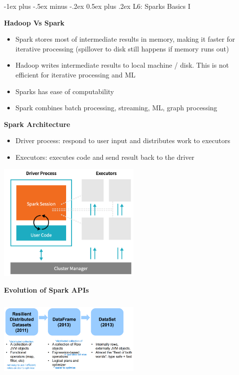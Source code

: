\documentclass[10pt, landscape]{article}
\makeatletter
\renewcommand{\section}{\@startsection{section}{1}{0mm}%
                                {-1ex plus -.5ex minus -.2ex}%
                                {0.5ex plus .2ex}%
                                {\normalfont\large\bfseries}}
\makeatother
\begin{document}
\begin{multicols}{4}

\section{L6: Sparks Basics I}

\textbf{Hadoop Vs Spark}
\begin{itemize}
  \item Spark stores most of intermediate results in memory, making it faster for iterative processing (spillover to disk still happens if memory runs out)
  \item Hadoop writes intermediate results to local machine / disk. This is not efficient for iterative processing and ML 
  \item Sparks has ease of computability
  \item Spark combines batch processing, streaming, ML, graph processing 
\end{itemize}

\textbf{Spark Architecture}
\begin{itemize}
  \item Driver process: respond to user input and distributes work to executors
  \item Executors: executes code and send result back to the driver
\end{itemize}

\includegraphics*[width=7cm]{spark_arch}

\textbf{Evolution of Spark APIs}

\includegraphics*[width=7cm, height=4cm]{spark_evo}



\end{multicols}
\end{document}
